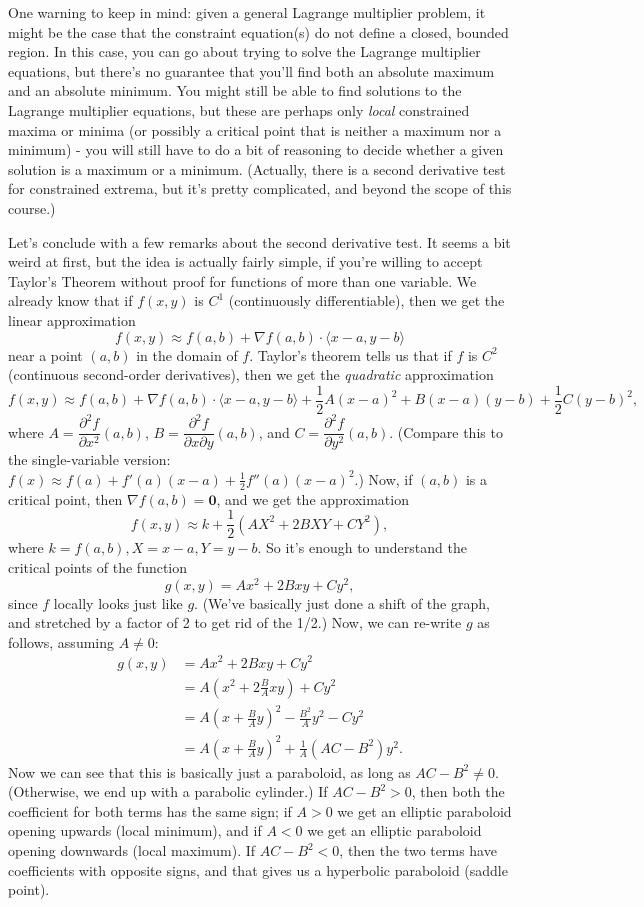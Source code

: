 \documentclass[12pt,letterpaper]{article}
\begin{document}
\medskip

One warning to keep in mind: given a general Lagrange multiplier problem, it might be the case that the constraint equation(s) do not define a closed, bounded region. In this case, you can go about trying to solve the Lagrange multiplier equations, but there's no guarantee that you'll find both an absolute maximum and an absolute minimum. You might still be able to find solutions to the Lagrange multiplier equations, but these are perhaps only {\em local} constrained maxima or minima (or possibly a critical point that is neither a maximum nor a minimum) - you will still have to do a bit of reasoning to decide whether a given solution is a maximum or a minimum. (Actually, there is a second derivative test for constrained extrema, but it's pretty complicated, and beyond the scope of this course.)

\bigskip

Let's conclude with a few remarks about the second derivative test. It seems a bit weird at first, but the idea is actually fairly simple, if you're willing to accept Taylor's Theorem without proof for functions of more than one variable. We already know that if $f(x,y)$ is $C^1$ (continuously differentiable), then we get the linear approximation
\[
f(x,y) \approx f(a,b) +\nabla f(a,b)\cdot\langle x-a,y-b\rangle
\]
near a point $(a,b)$ in the domain of $f$. Taylor's theorem tells us that if $f$ is $C^2$ (continuous second-order derivatives), then we get the {\em quadratic} approximation
\[
f(x,y) \approx f(a,b) + \nabla f(a,b)\cdot \langle x-a,y-b\rangle +\frac{1}{2}A(x-a)^2+B(x-a)(y-b)+\frac{1}{2}C(y-b)^2,
\]
where $A = \dfrac{\partial ^2 f}{\partial x^2}(a,b)$, $B = \dfrac{\partial^2 f}{\partial x\partial y}(a,b)$, and $C =\dfrac{\partial^2 f}{\partial y^2}(a,b)$. (Compare this to the single-variable version: $f(x)\approx f(a) + f'(a)(x-a)+\frac{1}{2}f''(a)(x-a)^2$.) Now, if $(a,b)$ is a critical point, then $\nabla f(a,b)=\mathbf{0}$, and we get the approximation
\[
f(x,y) \approx k+ \frac{1}{2}\left(AX^2+2BXY+CY^2\right),
\]
where $k=f(a,b), X=x-a, Y=y-b$. So it's enough to understand the critical points of the function
\[
g(x,y) = Ax^2+2Bxy+Cy^2,
\]
since $f$ locally looks just like $g$. (We've basically just done a shift of the graph, and stretched by a factor of 2 to get rid of the 1/2.) Now, we can re-write $g$ as follows, assuming $A\neq 0$:
\begin{align*}
g(x,y) & = Ax^2+2Bxy+Cy^2\\
& = A(x^2+2\frac{B}{A}xy) + Cy^2\\
& = A(x+\frac{B}{A}y)^2 - \frac{B^2}{A}y^2-Cy^2\\
& = A(x+\frac{B}{A}y)^2 + \frac{1}{A}(AC-B^2)y^2.
\end{align*}
Now we can see that this is basically just a paraboloid, as long as $AC-B^2\neq 0$. (Otherwise, we end up with a parabolic cylinder.) If $AC-B^2>0$, then both the coefficient for both terms has the same sign; if $A>0$ we get an elliptic paraboloid opening upwards (local minimum), and if $A<0$ we get an elliptic paraboloid opening downwards (local maximum). If $AC-B^2<0$, then the two terms have coefficients with opposite signs, and that gives us a hyperbolic paraboloid (saddle point).
\end{document}
